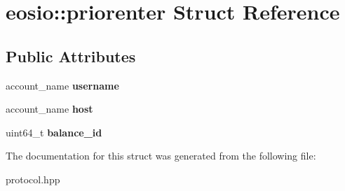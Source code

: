 \hypertarget{structeosio_1_1priorenter}{}\section{eosio\+:\+:priorenter Struct Reference}
\label{structeosio_1_1priorenter}
\subsection*{Public Attributes}
\begin{DoxyCompactItemize}
\item 
\mbox{\label{structeosio_1_1priorenter_ae3038e7310cc8d4f6e51a05cd12d7068}} 
account\+\_\+name {\bfseries username}
\item 
\mbox{\label{structeosio_1_1priorenter_ae63a12cbf47bd9c1a0d9d88681378c32}} 
account\+\_\+name {\bfseries host}
\item 
\mbox{\label{structeosio_1_1priorenter_a16e82138bae0102b2aa258b71a450857}} 
uint64\+\_\+t {\bfseries balance\+\_\+id}
\end{DoxyCompactItemize}


The documentation for this struct was generated from the following file\+:\begin{DoxyCompactItemize}
\item 
protocol.\+hpp\end{DoxyCompactItemize}
